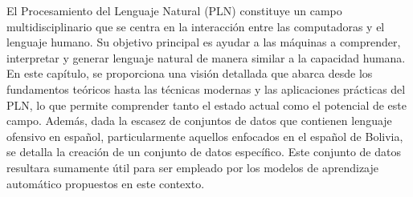 El Procesamiento del Lenguaje Natural (PLN) constituye un campo multidisciplinario que se centra en la interacción entre las computadoras y el lenguaje humano. Su objetivo principal es ayudar a las máquinas a comprender, interpretar y generar lenguaje natural de manera similar a la capacidad humana. En este capítulo, se proporciona una visión detallada que abarca desde los fundamentos teóricos hasta las técnicas modernas y las aplicaciones prácticas del PLN, lo que permite comprender tanto el estado actual como el potencial de este campo. Además, dada la escasez de conjuntos de datos que contienen lenguaje ofensivo en español, particularmente aquellos enfocados en el español de Bolivia, se detalla la creación de un conjunto de datos específico. Este conjunto de datos resultara sumamente útil para ser empleado por los modelos de aprendizaje automático propuestos en este contexto.
